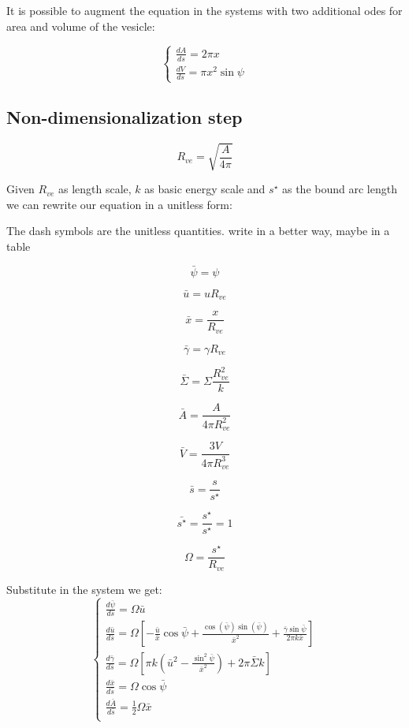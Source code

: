 \documentclass[12pt]{article}
\begin{document}
It is possible to augment the equation in the systems with two additional odes for area and volume of the vesicle:

\begin{equation}
  \begin{cases}
    \frac{dA}{ds} =  2 \pi x \\[3mm]
    \frac{dV}{ds} = \pi x^2 \sin{\psi}
  \end{cases}
\end{equation}



\subsection{Non-dimensionalization step}
$$
R_{ve} = \sqrt{\frac{A}{4 \pi}}
$$

Given $R_{ve}$ as length scale, $k$ as basic energy scale and $s^\star$ as the bound arc length we can rewrite our equation in a unitless form:

The dash symbols are the unitless quantities.
\alert{write in a better way, maybe in a table}


$$
\bar{\psi} = \psi
$$

$$
\bar{u} = u R_{ve}
$$

$$
\bar{x} = \frac{x}{R_{ve}}
$$

$$
\bar{\gamma} = \gamma R_{ve}
$$

$$
\bar{\Sigma} = \Sigma \frac{R_{ve}^2}{k}
$$

$$
\bar{A} = \frac{A}{4 \pi R_{ve}^2 }
$$

$$
\bar{V} = \frac{3V}{4 \pi R_{ve}^3 }
$$

$$
\bar{s} = \frac{s}{s^\star}
$$

$$
\bar{s^\star} = \frac{s^\star}{s^\star} = 1
$$

$$
\Omega = \frac{s^\star}{R_{ve}}
$$
 

Substitute in the system we get:
\begin{equation}
  \begin{cases} 
    
    \frac{d\bar{\psi}}{d\bar{s}} = \Omega \bar{u} \\[3mm]
    \frac{d\bar{u}}{d\bar{s}} = \Omega [-\frac{\bar{u}}{\bar{x}}\cos\bar{\psi}+\frac{\cos(\bar{\psi})\sin(\bar{\psi})}{\bar{x}^2}+\frac{\bar{\gamma}\sin \bar{\psi}}{2\pi k \bar{x}}] \\[3mm]
    \frac{d\bar{\gamma}}{d\bar{s}} = \Omega [\pi k (\bar{u}^2-\frac{\sin^2 \bar{\psi}}{\bar{x}^2})+2 \pi \bar{\Sigma} k] \\[3mm]
    \frac{d\bar{x}}{d\bar{s}} = \Omega \cos \bar{\psi} \\[3mm]
    \frac{d\bar{A}}{d\bar{s}} = \frac{1}{2}\Omega \bar{x} \\[3mm]
  \end{cases}
\end{equation}
\end{document}
